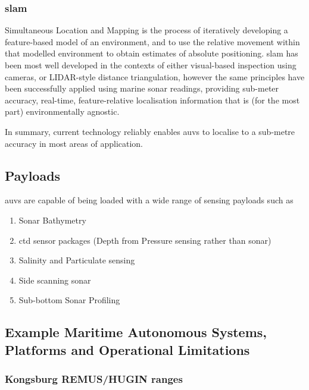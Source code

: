\subsubsection{\gls{slam}}
Simultaneous Location and Mapping is the process of iteratively developing a feature-based model of an environment, and to use the relative movement within that modelled environment to obtain estimates of absolute positioning.
\gls{slam} has been most well developed in the contexts of either visual-based inspection using cameras, or LIDAR-style distance triangulation, however the same principles have been successfully applied using marine sonar readings, providing sub-meter accuracy, real-time, feature-relative localisation information that is (for the most part) environmentally agnostic\cite{Williams2000}.


In summary, current technology reliably enables \glspl{auv} to localise to a sub-metre accuracy in most areas of application.

\subsection{Payloads}

\glspl{auv} are capable of being loaded with a wide range of sensing payloads such as
\begin{enumerate}
	\item Sonar Bathymetry
	\item \gls{ctd} sensor packages (Depth from Pressure sensing rather than sonar)
	\item Salinity and Particulate sensing
	\item Side scanning sonar 
	\item Sub-bottom Sonar Profiling
\end{enumerate}


\subsection{Example Maritime Autonomous Systems, Platforms and Operational Limitations}

\subsubsection{Kongsburg REMUS/HUGIN ranges}

